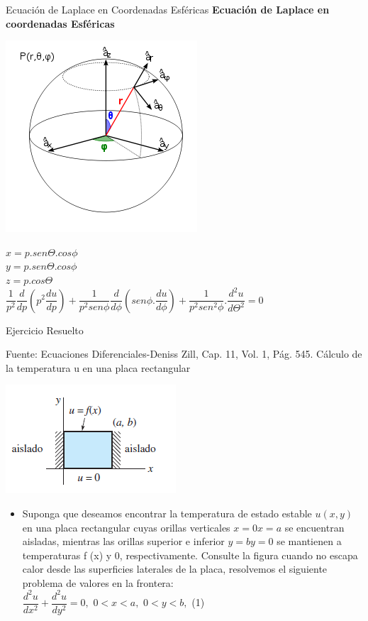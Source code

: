 \documentclass[11pt]{beamer}
\begin{document}
\begin{frame}{Ecuación de Laplace en Coordenadas Esféricas}
\textbf{Ecuación de Laplace en coordenadas Esféricas}
\begin{center}
\includegraphics[scale=0.4]{cil.png} 
\end{center}
\begin{center}
$x=p.sen\Theta.cos\phi$\\
$y=p.sen\Theta.cos\phi$\\
$z=p.cos\Theta$\\
$\dfrac{1}{p^{2}}\dfrac{d}{dp}(p^{2}\dfrac{du}{dp})+\dfrac{1}{p^{2}sen\phi}\dfrac{d}{d\phi}(sen\phi.\dfrac{du}{d\phi})+\dfrac{1}{p^{2}sen^{2}\phi}.\dfrac{d^{2}u}{d\Theta^{2}}=0$\\
\end{center}

\end{frame}
\begin{frame}{Ejercicio Resuelto}

Fuente: Ecuaciones Diferenciales-Deniss Zill, Cap. 11, Vol. 1, Pág. 545.
Cálculo de la temperatura u en una placa rectangular

\begin{center}
\includegraphics[scale=0.7]{placa.png} 
\end{center}

  \begin{itemize}
  \item
    Suponga que deseamos encontrar la temperatura de estado estable
$u(x, y)$ en una placa rectangular cuyas orillas verticales $x=0 x=a$ se encuentran aisladas,
mientras las orillas superior e inferior $y=b y=0$ se mantienen a temperaturas f (x)
y 0, respectivamente. Consulte la figura cuando no escapa calor desde las superficies
laterales de la placa, resolvemos el siguiente problema de valores en la frontera:\\
$\dfrac{d^{2}u}{dx^{2}}+\dfrac{d^{2}u}{dy^{2}}=0, $
$ 0<x<a,$
$0<y<b,$ (1)\\

  \end{itemize}
\end{frame}
\end{document}
